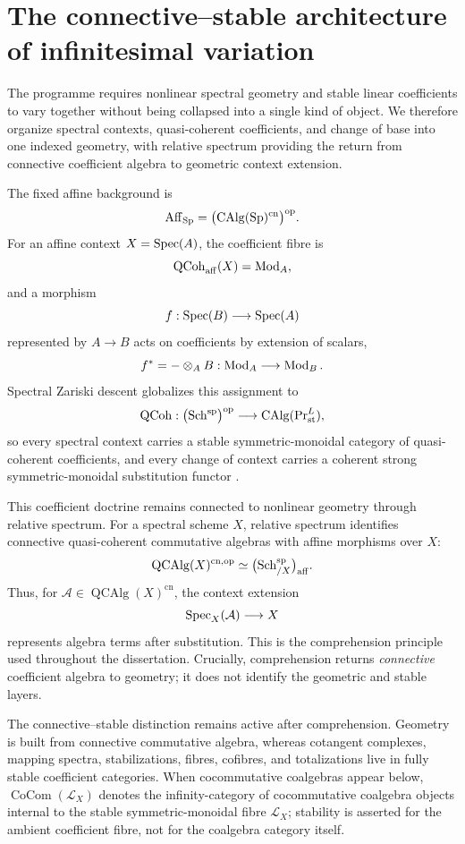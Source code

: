 \section{The connective--stable architecture of infinitesimal variation}
\label{sec:intro-spectral-contexts}

The programme requires nonlinear spectral geometry and stable linear
coefficients to vary together without being collapsed into a single kind of
object.  We therefore organize spectral contexts, quasi-coherent
coefficients, and change of base into one indexed geometry, with relative
spectrum providing the return from connective coefficient algebra to
geometric context extension.

The fixed affine background is
\[
    \operatorname{Aff}_{\operatorname{Sp}}
    =
    \bigl(\operatorname{CAlg}(\operatorname{Sp})^{\mathrm{cn}}\bigr)^{\mathrm{op}}.
\]
For an affine context \(X=\operatorname{Spec}(A)\), the coefficient fibre is
\[
    \operatorname{QCoh}_{\mathrm{aff}}(X)=\operatorname{Mod}_A,
\]
and a morphism
\[
    f:\operatorname{Spec}(B)\longrightarrow \operatorname{Spec}(A)
\]
represented by \(A\to B\) acts on coefficients by extension of scalars,
\[
    f^*=-\otimes_A B:\operatorname{Mod}_A\longrightarrow\operatorname{Mod}_B.
\]
Spectral Zariski descent globalizes this assignment to
\[
    \operatorname{QCoh}:
    \bigl(\operatorname{Sch}^{\mathrm{sp}}\bigr)^{\mathrm{op}}
    \longrightarrow
    \operatorname{CAlg}(\operatorname{Pr}^L_{\mathrm{st}}),
\]
so every spectral context carries a stable symmetric-monoidal category of
quasi-coherent coefficients, and every change of context carries a coherent
strong symmetric-monoidal substitution functor
\cite{LurieHigherAlgebra,LurieSAG}.

This coefficient doctrine remains connected to nonlinear geometry through
relative spectrum.  For a spectral scheme \(X\), relative spectrum identifies
connective quasi-coherent commutative algebras with affine morphisms over
\(X\):
\[
    \operatorname{QCAlg}(X)^{\mathrm{cn},\mathrm{op}}
    \simeq
    \bigl(\operatorname{Sch}^{\mathrm{sp}}_{/X}\bigr)_{\mathrm{aff}}.
\]
Thus, for
\(\mathcal A\in\operatorname{QCAlg}(X)^{\mathrm{cn}}\), the context extension
\[
    \operatorname{Spec}_X(\mathcal A)\longrightarrow X
\]
represents algebra terms after substitution.  This is the comprehension
principle used throughout the dissertation.  Crucially, comprehension returns \emph{connective} coefficient algebra to
geometry; it does not identify the geometric and stable layers.

The connective--stable distinction remains active after comprehension.
Geometry is built from connective commutative algebra, whereas
cotangent complexes, mapping spectra, stabilizations, fibres, cofibres, and
totalizations live in fully stable coefficient categories.  When
cocommutative coalgebras appear below,
\(\operatorname{CoCom}(\mathcal L_X)\) denotes the infinity-category of
cocommutative coalgebra objects internal to the stable symmetric-monoidal
fibre \(\mathcal L_X\); stability is asserted for the ambient coefficient
fibre, not for the coalgebra category itself.

